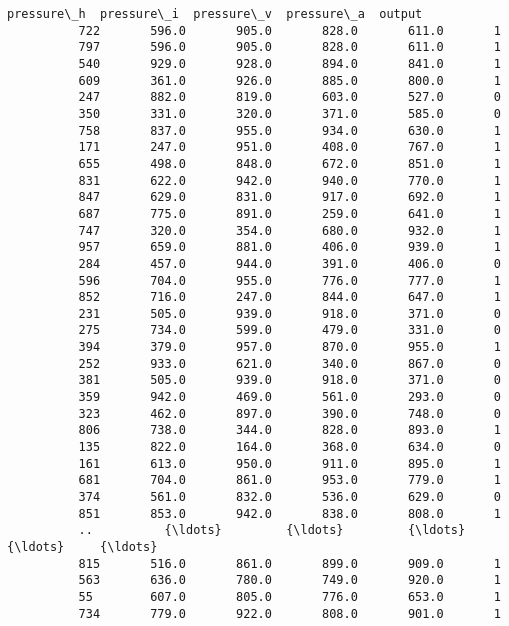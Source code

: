 \documentclass[11pt]{article}
\begin{document}
\begin{Verbatim}[commandchars=\\\{\}]
               pressure\_h  pressure\_i  pressure\_v  pressure\_a  output  
          722       596.0       905.0       828.0       611.0       1  
          797       596.0       905.0       828.0       611.0       1  
          540       929.0       928.0       894.0       841.0       1  
          609       361.0       926.0       885.0       800.0       1  
          247       882.0       819.0       603.0       527.0       0  
          350       331.0       320.0       371.0       585.0       0  
          758       837.0       955.0       934.0       630.0       1  
          171       247.0       951.0       408.0       767.0       1  
          655       498.0       848.0       672.0       851.0       1  
          831       622.0       942.0       940.0       770.0       1  
          847       629.0       831.0       917.0       692.0       1  
          687       775.0       891.0       259.0       641.0       1  
          747       320.0       354.0       680.0       932.0       1  
          957       659.0       881.0       406.0       939.0       1  
          284       457.0       944.0       391.0       406.0       0  
          596       704.0       955.0       776.0       777.0       1  
          852       716.0       247.0       844.0       647.0       1  
          231       505.0       939.0       918.0       371.0       0  
          275       734.0       599.0       479.0       331.0       0  
          394       379.0       957.0       870.0       955.0       1  
          252       933.0       621.0       340.0       867.0       0  
          381       505.0       939.0       918.0       371.0       0  
          359       942.0       469.0       561.0       293.0       0  
          323       462.0       897.0       390.0       748.0       0  
          806       738.0       344.0       828.0       893.0       1  
          135       822.0       164.0       368.0       634.0       0  
          161       613.0       950.0       911.0       895.0       1  
          681       704.0       861.0       953.0       779.0       1  
          374       561.0       832.0       536.0       629.0       0  
          851       853.0       942.0       838.0       808.0       1  
          ..          {\ldots}         {\ldots}         {\ldots}         {\ldots}     {\ldots}  
          815       516.0       861.0       899.0       909.0       1  
          563       636.0       780.0       749.0       920.0       1  
          55        607.0       805.0       776.0       653.0       1  
          734       779.0       922.0       808.0       901.0       1  

\end{Verbatim}
\end{document}
